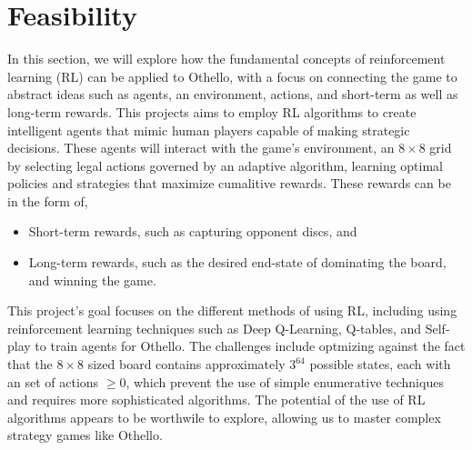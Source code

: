 \documentclass[../proposal.tex]{subfiles}
\begin{document}
\section{Feasibility}
\label{feasibility}
In this section, we will explore how the fundamental concepts of reinforcement learning (RL) can be applied to Othello, with a focus on connecting the game to abstract ideas such as agents, an environment, actions, and short-term as well as long-term rewards. This projects aims to employ RL algorithms to create intelligent agents that mimic human players capable of making strategic decisions. These agents will interact with the game's environment, an $8\times8$ grid by selecting legal actions governed by an adaptive algorithm, learning optimal policies and strategies that maximize cumalitive rewards. These rewards can be in the form of,
\begin{itemize}
  \item Short-term rewards, such as capturing opponent discs, and
  \item Long-term rewards, such as the desired end-state of dominating the board, and winning the game.
\end{itemize}
This project's goal focuses on the different methods of using RL, including using reinforcement learning techniques such as Deep Q-Learning, Q-tables, and Self-play to train agents for Othello. The challenges include optmizing against the fact that the $8\times8$ sized board contains approximately $3^{64}$ possible states, each with an set of actions $\geq0$, which prevent the use of simple enumerative techniques and requires more sophisticated algorithms. The potential of the use of RL algorithms appears to be worthwile to explore, allowing us to master complex strategy games like Othello.
\end{document}
